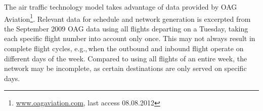 The air traffic technology model takes advantage of data provided by OAG Aviation\footnote{\url{www.oagaviation.com}, last access 08.08.2012}. 
Relevant data for schedule and network generation is excerpted from the September 2009 OAG data using all flights departing on a Tuesday, taking each specific flight number into account only once.
This may not always result in complete flight cycles, e.g.,\,when the outbound and inbound flight operate on different days of the week. 
Compared to using all flights of an entire week, the network may be incomplete, as certain destinations are only served on specific days.



